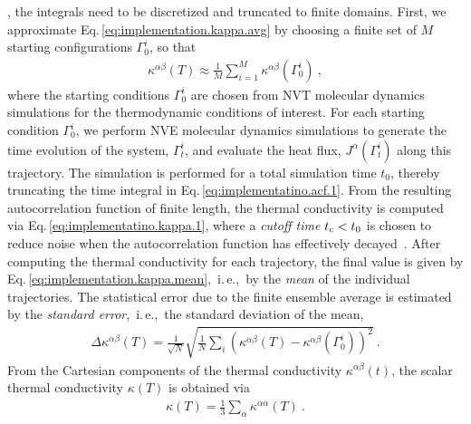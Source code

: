 , the integrals need to be discretized and truncated to finite domains. First, we approximate Eq.\,\eqref{eq:implementation.kappa.avg} by choosing a finite set of $M$ starting configurations $\Gamma_0^i$, so that
\begin{align}
	\kappa^{\alpha \beta} (T)
		\approx
		\frac{1}{M} \sum_{i=1}^M \kappa^{\alpha \beta} (\Gamma_0^i)~,
	\label{eq:implementation.kappa.mean}
\end{align}
where the starting conditions $\Gamma_0^i$ are chosen from NVT molecular dynamics simulations for the thermodynamic conditions of interest. For each starting condition $\Gamma_0^i$, we perform NVE molecular dynamics simulations to generate the time evolution of the system, $\Gamma_t^i$, and evaluate the heat flux, $J^\alpha (\Gamma_t^i)$ along this trajectory. The simulation is performed for a total simulation time $t_0$, thereby truncating the time integral in Eq.\,\eqref{eq:implementatino.acf.1}. From the resulting autocorrelation function of finite length, the thermal conductivity is computed via Eq.\,\eqref{eq:implementatino.kappa.1}, where a \emph{cutoff time} $t_{\rm c} < t_0$ is chosen to reduce noise when the autocorrelation function has effectively decayed~\cite{Jones2012}.
After computing the thermal conductivity for each trajectory, the final value is given by Eq.\,\eqref{eq:implementation.kappa.mean},~i.\,e.,~by the \emph{mean} of the individual trajectories. The statistical error due to the finite ensemble average is estimated by the \emph{standard error},~i.\,e.,~the standard deviation of the mean,
\begin{align}
	\Delta \kappa^{\alpha \beta} (T)
		= \frac{1}{\sqrt{N}} \sqrt{\frac{1}{N} \sum_i \left( \kappa^{\alpha \beta} (T) - \kappa^{\alpha \beta} (\Gamma_0^i) \right)^2}~.
	\label{eq:imp.kappa.err}
\end{align}
From the Cartesian components of the thermal conductivity $\kappa^{\alpha \beta} (t)$, the scalar thermal conductivity $\kappa (T)$ is obtained via
\begin{align}
	\kappa (T)
		= \frac{1}{3} \sum_{\alpha} \kappa^{\alpha \alpha} (T)~.
	\label{eq:kappa.scalar}
\end{align}


